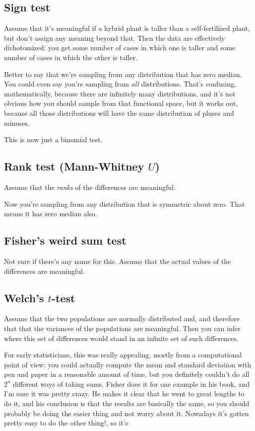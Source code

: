 \documentclass{book}
\begin{document}
\subsection{Sign test}\label{sign-test}

Assume that it's meaningful if a hybrid plant is taller than a
self-fertilized plant, but don't assign any meaning beyond that. Then
the data are effectively dichotomized: you get some number of cases in
which one is taller and some number of cases in which the other is
taller.

Better to say that we're sampling from any distribution that has zero
median. You could even say you're sampling from \emph{all}
distributions. That's confusing, mathematically, because there are
infinitely many distributions, and it's not obvious how you should
sample from that functional space, but it works out, because all those
distributions will have the same distribution of pluses and minuses.

This is now just a binomial test.

\subsection{Rank test (Mann-Whitney $U$)}

Assume that the \emph{ranks} of the differences are meaningful.

Now you're sampling from any distribution that is symmetric about zero.
That means it has zero median also.

\subsection{Fisher's weird sum test}\label{fishers-weird-sum-test}

Not sure if there's any name for this. Assume that the actual values of
the differences are meaningful.

\subsection{Welch's $t$-test}

Assume that the two populations are normally distributed and, and
therefore that that the variances of the populations are meaningful.
Then you can infer where this set of differences would stand in an
infinite set of such differences.

For early statisticians, this was really appealing, mostly from a
computational point of view: you could actually compute the mean and
standard deviation with pen and paper in a reasonable amount of time,
but you definitely couldn't do all \(2^n\) different ways of taking
sums. Fisher does it for one example in his book, and I'm sure it was
pretty crazy. He makes it clear that he went to great lengths to do it,
and his conclusion is that the results are basically the same, so you
should probably be doing the easier thing and not worry about it.
Nowadays it's gotten pretty easy to do the other thing!, so it's
\end{document}
